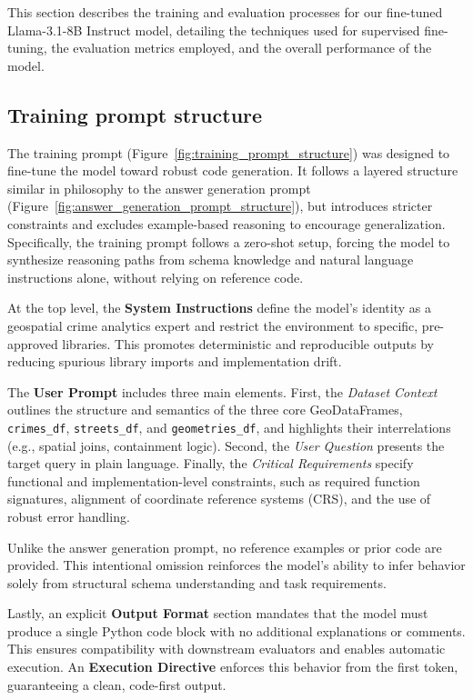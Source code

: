 This section describes the training and evaluation processes for our fine-tuned Llama-3.1-8B Instruct model, detailing the techniques used for supervised fine-tuning, the evaluation metrics employed, and the overall performance of the model.


\subsection{Training prompt structure}

The training prompt (Figure~\ref{fig:training_prompt_structure}) was designed to fine-tune the model toward robust code generation. It follows a layered structure similar in philosophy to the answer generation prompt (Figure~\ref{fig:answer_generation_prompt_structure}), but introduces stricter constraints and excludes example-based reasoning to encourage generalization. Specifically, the training prompt follows a zero-shot setup, forcing the model to synthesize reasoning paths from schema knowledge and natural language instructions alone, without relying on reference code.

At the top level, the \textbf{System Instructions} define the model’s identity as a geospatial crime analytics expert and restrict the environment to specific, pre-approved libraries. This promotes deterministic and reproducible outputs by reducing spurious library imports and implementation drift.

The \textbf{User Prompt} includes three main elements. First, the \textit{Dataset Context} outlines the structure and semantics of the three core GeoDataFrames, \texttt{crimes\_df}, \texttt{streets\_df}, and \texttt{geometries\_df}, and highlights their interrelations (e.g., spatial joins, containment logic). Second, the \textit{User Question} presents the target query in plain language. Finally, the \textit{Critical Requirements} specify functional and implementation-level constraints, such as required function signatures, alignment of coordinate reference systems (CRS), and the use of robust error handling.

Unlike the answer generation prompt, no reference examples or prior code are provided. This intentional omission reinforces the model's ability to infer behavior solely from structural schema understanding and task requirements.

Lastly, an explicit \textbf{Output Format} section mandates that the model must produce a single Python code block with no additional explanations or comments. This ensures compatibility with downstream evaluators and enables automatic execution. An \textbf{Execution Directive} enforces this behavior from the first token, guaranteeing a clean, code-first output.


